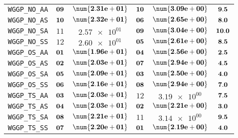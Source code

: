 \begin{xltabular}{\textwidth}{l||CC|CC||C}
	\texttt{WGGP\_NO\_AA} & $\bf 09$ & $\bf \num{2.31e+01}$ & $\bf 10$ & $\bf \num{3.09e+00}$ &$\bf 9.5$  \\
	\texttt{WGGP\_NO\_AS} & $\bf 10$ & $\bf \num{2.32e+01}$ & $\bf 06$ & $\bf \num{2.65e+00}$ &$\bf 8.0$  \\
	\texttt{WGGP\_NO\_SA} & $ 11$ & $ \num{2.57e+01}$ & $\bf 09$ & $\bf \num{3.04e+00}$ &$\bf 10.0$  \\
	\texttt{WGGP\_NO\_SS} & $ 12$ & $ \num{2.60e+01}$ & $\bf 05$ & $\bf \num{2.61e+00}$ &$\bf 8.5$  \\
	\texttt{WGGP\_OS\_AA} & $\bf 01$ & $\bf \num{1.96e+01}$ & $\bf 04$ & $\bf \num{2.56e+00}$ &$\bf 2.5$  \\
	\texttt{WGGP\_OS\_AS} & $\bf 02$ & $\bf \num{2.03e+01}$ & $\bf 07$ & $\bf \num{2.94e+00}$ &$\bf 4.5$  \\
	\texttt{WGGP\_OS\_SA} & $\bf 05$ & $\bf \num{2.09e+01}$ & $\bf 03$ & $\bf \num{2.50e+00}$ &$\bf 4.0$  \\
	\texttt{WGGP\_OS\_SS} & $\bf 06$ & $\bf \num{2.16e+01}$ & $\bf 08$ & $\bf \num{2.94e+00}$ &$\bf 7.0$  \\
	\texttt{WGGP\_TS\_AA} & $\bf 03$ & $\bf \num{2.03e+01}$ & $ 12$ & $ \num{3.19e+00}$ &$\bf 7.5$  \\
	\texttt{WGGP\_TS\_AS} & $\bf 04$ & $\bf \num{2.03e+01}$ & $\bf 02$ & $\bf \num{2.21e+00}$ &$\bf 3.0$  \\
	\texttt{WGGP\_TS\_SA} & $\bf 08$ & $\bf \num{2.21e+01}$ & $ 11$ & $ \num{3.14e+00}$ &$\bf 9.5$  \\
	\texttt{WGGP\_TS\_SS} & $\bf 07$ & $\bf \num{2.20e+01}$ & $\bf 01$ & $\bf \num{2.19e+00}$ &$\bf 4.0$  \\
\end{xltabular}
